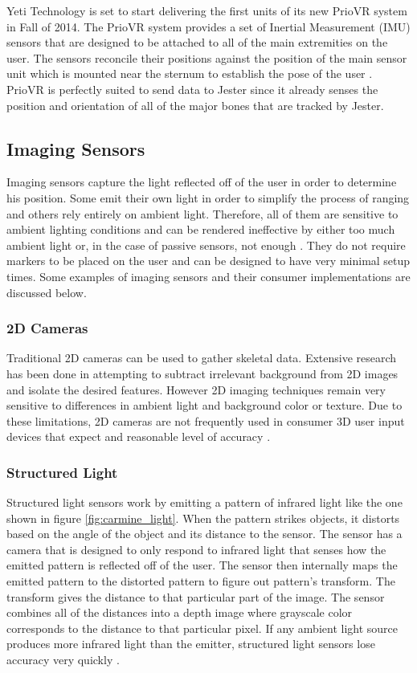Yeti Technology is set to start delivering the first units of its new PrioVR system in Fall of 2014. The PrioVR system provides a set of Inertial Measurement (IMU) sensors that are designed to be attached to all of the main extremities on the user. The sensors reconcile their positions against the position of the main sensor unit which is mounted near the sternum to establish the pose of the user \cite{priovr}. PrioVR is perfectly suited to send data to Jester since it already senses the position and orientation of all of the major bones that are tracked by Jester.

\subsection{Imaging Sensors}

Imaging sensors capture the light reflected off of the user in order to determine his position. Some emit their own light in order to simplify the process of ranging and others rely entirely on ambient light. Therefore, all of them are sensitive to ambient lighting conditions and can be rendered ineffective by either too much ambient light or, in the case of passive sensors, not enough \cite{besl1988active}. They do not require markers to be placed on the user and can be designed to have very minimal setup times. Some examples of imaging sensors and their consumer implementations are discussed below.

\subsubsection{2D Cameras}

Traditional 2D cameras can be used to gather skeletal data. Extensive research has been done in attempting to subtract irrelevant background from 2D images and isolate the desired features. However 2D imaging techniques remain very sensitive to differences in ambient light and background color or texture. Due to these limitations, 2D cameras are not frequently used in consumer 3D user input devices that expect and reasonable level of accuracy \cite{shimada2001real}.

\subsubsection{Structured Light}

Structured light sensors work by emitting a pattern of infrared light like the one shown in figure \ref{fig:carmine_light}. When the pattern strikes objects, it distorts based on the angle of the object and its distance to the sensor. The sensor has a camera that is designed to only respond to infrared light that senses how the emitted pattern is reflected off of the user. The sensor then internally maps the emitted pattern to the distorted pattern to figure out pattern’s transform. The transform gives the distance to that particular part of the image. The sensor combines all of the distances into a depth image where grayscale color corresponds to the distance to that particular pixel. If any ambient light source produces more infrared light than the emitter, structured light sensors lose accuracy very quickly \cite{scharstein2003high}.

